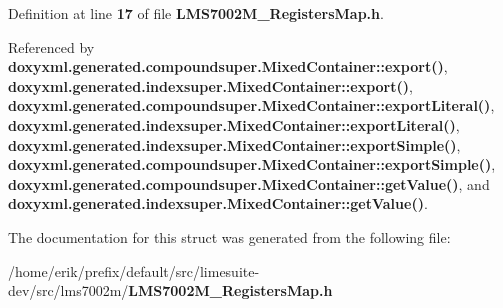 Definition at line {\bf 17} of file {\bf L\+M\+S7002\+M\+\_\+\+Registers\+Map.\+h}.



Referenced by {\bf doxyxml.\+generated.\+compoundsuper.\+Mixed\+Container\+::export()}, {\bf doxyxml.\+generated.\+indexsuper.\+Mixed\+Container\+::export()}, {\bf doxyxml.\+generated.\+compoundsuper.\+Mixed\+Container\+::export\+Literal()}, {\bf doxyxml.\+generated.\+indexsuper.\+Mixed\+Container\+::export\+Literal()}, {\bf doxyxml.\+generated.\+indexsuper.\+Mixed\+Container\+::export\+Simple()}, {\bf doxyxml.\+generated.\+compoundsuper.\+Mixed\+Container\+::export\+Simple()}, {\bf doxyxml.\+generated.\+compoundsuper.\+Mixed\+Container\+::get\+Value()}, and {\bf doxyxml.\+generated.\+indexsuper.\+Mixed\+Container\+::get\+Value()}.



The documentation for this struct was generated from the following file\+:\begin{DoxyCompactItemize}
\item 
/home/erik/prefix/default/src/limesuite-\/dev/src/lms7002m/{\bf L\+M\+S7002\+M\+\_\+\+Registers\+Map.\+h}\end{DoxyCompactItemize}
